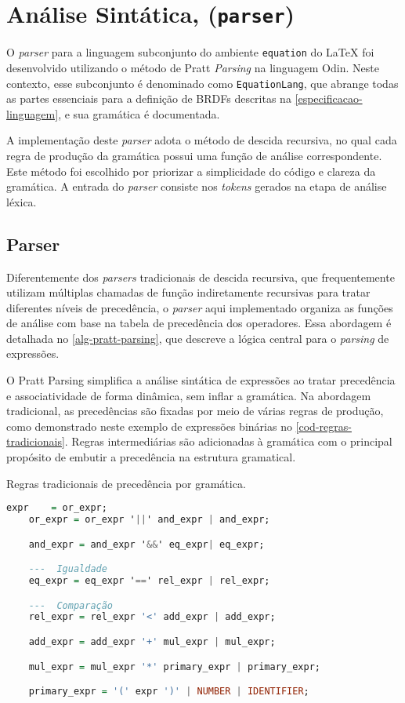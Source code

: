 
\section{Análise Sintática, (\texttt{parser})} \label{section-parser}

O \textit{parser} para a linguagem subconjunto do ambiente \verb|equation| do \LaTeX{} foi desenvolvido utilizando o método de Pratt \textit{Parsing} na linguagem Odin. Neste contexto, esse subconjunto é denominado como \texttt{EquationLang}, que abrange todas as partes essenciais para a definição de BRDFs descritas na \autoref{especificacao-linguagem}, e sua gramática é documentada.

A implementação deste \textit{parser} adota o método de descida recursiva, no qual cada regra de produção da gramática possui uma função de análise correspondente. Este método foi escolhido por priorizar a  simplicidade do código e clareza da gramática. A entrada do \textit{parser} consiste nos \textit{tokens} gerados na etapa de análise léxica.


\subsection{Parser} \label{section-parser-pratt}
Diferentemente dos \textit{parsers} tradicionais de descida recursiva, que frequentemente utilizam múltiplas chamadas de função indiretamente recursivas para tratar diferentes níveis de precedência, o \textit{parser} aqui implementado organiza as funções de análise com base na tabela de precedência dos operadores. Essa abordagem é detalhada no \autoref{alg-pratt-parsing}, que descreve a lógica central para o \textit{parsing} de expressões.

O Pratt Parsing simplifica a análise sintática de expressões ao tratar precedência e associatividade de forma dinâmica, sem inflar a gramática. Na abordagem tradicional, as precedências são fixadas por meio de várias regras de produção, como demonstrado neste exemplo de expressões binárias no \autoref{cod-regras-tradicionais}. Regras intermediárias são adicionadas à gramática com o principal propósito de embutir a precedência na estrutura gramatical.

\begin{codigo}[htb]
    \caption{\small Regras tradicionais de precedência por gramática. }
    \label{cod-regras-tradicionais}
\begin{lstlisting}[language=haskell, numbers=none, inputencoding=utf8]
    expr    = or_expr;
    or_expr = or_expr '||' and_expr | and_expr;

    and_expr = and_expr '&&' eq_expr| eq_expr;

    ---  Igualdade
    eq_expr = eq_expr '==' rel_expr | rel_expr;   

    ---  Comparação
    rel_expr = rel_expr '<' add_expr | add_expr;     

    add_expr = add_expr '+' mul_expr | mul_expr;

    mul_expr = mul_expr '*' primary_expr | primary_expr;

    primary_expr = '(' expr ')' | NUMBER | IDENTIFIER; 
\end{lstlisting}
\end{codigo}

